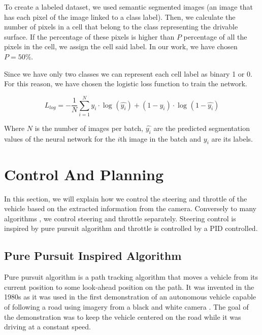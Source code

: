\documentclass{ctuthesis/ctuthesis}
\begin{document}
To create a labeled dataset, we used semantic segmented images (an image that has each pixel of the image linked to a class label). Then, we calculate the number of pixels in a cell that belong to the class representing the drivable surface. If the percentage of these pixels is higher than $P$ percentage of all the pixels in the cell, we assign the cell said label. In our work, we have chosen $P=50\%$.\par


Since we have only two classes we can represent each cell label as binary 1 or 0. For this reason, we have chosen the logistic loss function to train the network. \par

\begin{equation}
L_{log} = -\dfrac{1}{N} \sum_{i=1}^{N} y_i \cdot \log_{} (\hat{y_i}) + (1 - y_i) \cdot \log_{} (1-\hat{y_i})
\end{equation}

Where $N$ is the number of images per batch, $\hat{y_i}$ are the predicted segmentation values of the neural network for the $i$th image in the batch and $y_i$ are its labels. 




\section{Control And Planning}
In this section, we will explain how we control the steering and throttle of the vehicle based on the extracted information from the camera. Conversely to many algorithms \cite{Broggi2013}\cite{Werling2010}, we control steering and throttle separately. Steering control is inspired by pure pursuit algorithm and throttle is controlled by a PID controlled.


\subsection{Pure Pursuit Inspired Algorithm} \label{sec:pure_pursuit}
Pure pursuit algorithm is a path tracking algorithm that moves a vehicle from its current position to some look-ahead position on the path. It was invented in the 1980s as it was used in the first demonstration of an autonomous vehicle capable of following a road using imagery from a black and white camera \cite{pure_pursuit_orig}. The goal of the demonstration was to keep the vehicle centered on the road while it was driving at a constant speed.\par
\end{document}
